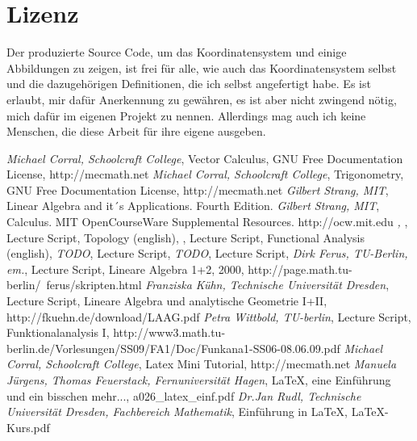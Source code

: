 \documentclass[a4paper]{article}
\begin{document}
\section{Lizenz}

Der produzierte Source Code, um das Koordinatensystem und einige Abbildungen zu zeigen, ist frei f\"ur alle,
wie auch das Koordinatensystem selbst und die dazugeh\"origen Definitionen, die ich selbst angefertigt habe.
Es ist erlaubt, mir daf\"ur Anerkennung zu gew\"ahren, es ist aber nicht zwingend n\"otig, mich daf\"ur im
eigenen Projekt zu nennen. Allerdings mag auch ich keine Menschen, die diese Arbeit f\"ur ihre eigene ausgeben.\\


\begin{thebibliography}

     \textit{Michael Corral, Schoolcraft College},
            Vector Calculus, GNU Free Documentation License, http://mecmath.net 
     \textit{Michael Corral, Schoolcraft College},
            Trigonometry, GNU Free Documentation License, http://mecmath.net
     \textit{Gilbert Strang, MIT},
            Linear Algebra and it´s Applications. Fourth Edition.        
     \textit{Gilbert Strang, MIT},
            Calculus. MIT OpenCourseWare Supplemental Resources. http://ocw.mit.edu    
     \textit{ ,  },
            Lecture Script, Topology (english),
     \textit{},
            Lecture Script, Functional Analysis (english),    
     \textit{TODO},
            Lecture Script, 
     \textit{TODO},
            Lecture Script,
     \textit{Dirk Ferus, TU-Berlin, em.},
            Lecture Script, Lineare Algebra 1+2, 2000, http://page.math.tu-berlin/~ferus/skripten.html
     \textit{Franziska K\"uhn, Technische Universit\"at Dresden},
            Lecture Script, Lineare Algebra und analytische Geometrie I+II, http://fkuehn.de/download/LAAG.pdf
     \textit{Petra Wittbold, TU-berlin},  
            Lecture Script, Funktionalanalysis I,  http://www3.math.tu-berlin.de/Vorlesungen/SS09/FA1/Doc/Funkana1-SS06-08.06.09.pdf
     \textit{Michael Corral, Schoolcraft College},
            Latex Mini Tutorial, http://mecmath.net                    
     \textit{Manuela J\"urgens, Thomas Feuerstack, Fernuniversit\"at Hagen},
            LaTeX, eine Einf\"uhrung und ein bisschen mehr..., a026\_latex\_einf.pdf            
     \textit{Dr.Jan Rudl, Technische Universit\"at Dresden, Fachbereich Mathematik},
            Einf\"uhrung in LaTeX, LaTeX-Kurs.pdf            
\end{thebibliography}



\printindex
\end{document}
